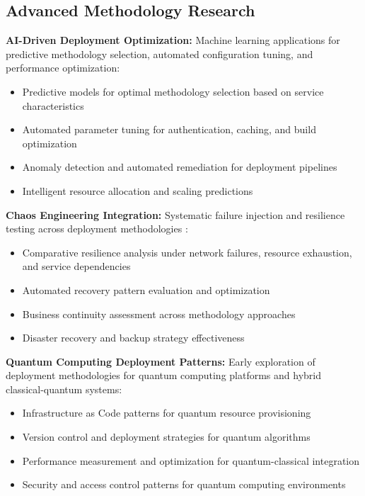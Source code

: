 \subsection{Advanced Methodology Research}
\label{subsec:advanced_methodology}

\textbf{AI-Driven Deployment Optimization:} Machine learning applications for predictive methodology selection, automated configuration tuning, and performance optimization:
\begin{itemize}
\item Predictive models for optimal methodology selection based on service characteristics
\item Automated parameter tuning for authentication, caching, and build optimization
\item Anomaly detection and automated remediation for deployment pipelines
\item Intelligent resource allocation and scaling predictions
\end{itemize}

\textbf{Chaos Engineering Integration:} Systematic failure injection and resilience testing across deployment methodologies \cite{chaos_engineering}:
\begin{itemize}
\item Comparative resilience analysis under network failures, resource exhaustion, and service dependencies
\item Automated recovery pattern evaluation and optimization
\item Business continuity assessment across methodology approaches
\item Disaster recovery and backup strategy effectiveness
\end{itemize}

\textbf{Quantum Computing Deployment Patterns:} Early exploration of deployment methodologies for quantum computing platforms and hybrid classical-quantum systems:
\begin{itemize}
\item Infrastructure as Code patterns for quantum resource provisioning
\item Version control and deployment strategies for quantum algorithms
\item Performance measurement and optimization for quantum-classical integration
\item Security and access control patterns for quantum computing environments
\end{itemize}

